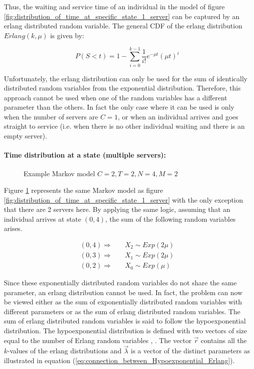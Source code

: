 Thus, the waiting and service time of an individual in the model of figure 
\ref{fig:distribution_of_time_at_specific_state_1_server} can be captured by an 
erlang distributed random variable. 
The general CDF of the erlang distribution \(Erlang(k, \mu)\) is given by:

\begin{equation} \label{eq:cdf_erlang}
    P(S < t) = 1 - \sum_{i=0}^{k-1} \frac{1}{i!} e^{-\mu t} (\mu t)^i
\end{equation}

Unfortunately, the erlang distribution can only be used for the sum of 
identically distributed random variables from the exponential distribution. 
Therefore, this approach cannot be used when one of the random variables has a 
different parameter than the others. 
In fact the only case where it can be used is only when the number of servers 
are \(C=1\), or when an individual arrives and goes straight to service 
(i.e. when there is no other individual waiting and there is an empty server).


\paragraph{Time distribution at a state (multiple servers):}

\begin{figure}[H]
    \centering
    \scalebox{0.75}{}
    \caption{Example Markov model \(C=2, T=2, N=4, M=2\)}
    \label{fig:distribution_of_time_at_specific_state_2_servers}
\end{figure}

Figure \ref{fig:distribution_of_time_at_specific_state_2_servers} represents the 
same Markov model as figure 
\ref{fig:distribution_of_time_at_specific_state_1_server} with the only 
exception that there are 2 servers here. 
By applying the same logic, assuming that an individual arrives at state 
\((0,4)\), the sum of the following random variables arises.

\begin{align}
    (0,4) \Rightarrow \quad & X_2 \sim Exp(2\mu) \nonumber \\
    (0,3) \Rightarrow \quad & X_1 \sim Exp(2\mu) \\
    (0,2) \Rightarrow \quad & X_0 \sim Exp(\mu) \nonumber
\end{align}

Since these exponentially distributed random variables do not share the same 
parameter, an erlang distribution cannot be used. 
In fact, the problem can now be viewed either as the sum of exponentially 
distributed random variables with different parameters or as the sum of 
erlang distributed random variables.
The sum of erlang distributed random variables is said to follow the 
hypoexponential distribution. 
The hypoexponential distribution is defined with two vectors of size equal
to the number of Erlang random variables \cite{Akkouchi2008}, \cite{Smaili2013}. 
The vector \(\vec{r}\) contains all the \(k\)-values of the erlang distributions 
and \(\vec{\lambda}\) is a vector of the distinct parameters as illustrated in
equation (\ref{eq:connection_between_Hypoexponential_Erlang}).

